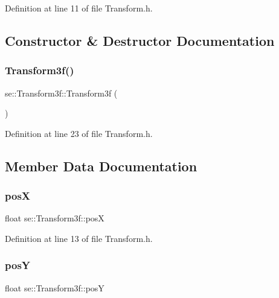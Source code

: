 Definition at line 11 of file Transform.\+h.



\subsection{Constructor \& Destructor Documentation}
\mbox{\label{classse_1_1_transform3f_ad3b4895905ce0ca7e62fdf41044b7afb}} 
\subsubsection{\texorpdfstring{Transform3f()}{Transform3f()}}
{\footnotesize\ttfamily se\+::\+Transform3f\+::\+Transform3f (\begin{DoxyParamCaption}{ }\end{DoxyParamCaption})\hspace{0.3cm}{\ttfamily [inline]}}



Definition at line 23 of file Transform.\+h.



\subsection{Member Data Documentation}
\mbox{\label{classse_1_1_transform3f_ad2c0078eef5e4b87361f764ad9ac4f84}} 
\subsubsection{\texorpdfstring{posX}{posX}}
{\footnotesize\ttfamily float se\+::\+Transform3f\+::posX}



Definition at line 13 of file Transform.\+h.

\mbox{\label{classse_1_1_transform3f_a3bc9b7dab3224ff12df803c157b86d3d}} 
\subsubsection{\texorpdfstring{posY}{posY}}
{\footnotesize\ttfamily float se\+::\+Transform3f\+::posY}



